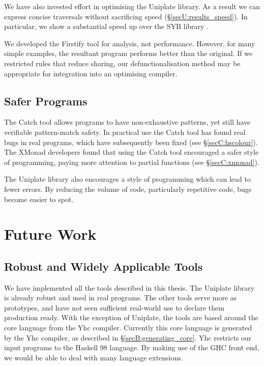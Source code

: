 We have also invested effort in optimising the Uniplate library. As a result we can express concise traversals without sacrificing speed (\S\ref{secU:results_speed}). In particular, we show a substantial speed up over the SYB library \cite{lammel:syb}.

We developed the Firstify tool for analysis, not performance. However, for many simple examples, the resultant program performs better than the original. If we restricted rules that reduce sharing, our defunctionalisation method may be appropriate for integration into an optimising compiler.

\subsection{Safer Programs}

The Catch tool allows programs to have non-exhaustive patterns, yet still have verifiable pattern-match safety. In practical use the Catch tool has found real bugs in real programs, which have subsequently been fixed (see \S\ref{secC:hscolour}). The XMonad developers found that using the Catch tool encouraged a safer style of programming, paying more attention to partial functions (see \S\ref{secC:xmonad}).

The Uniplate library also encourages a style of programming which can lead to fewer errors. By reducing the volume of code, particularly repetitive code, bugs become easier to spot.

\section{Future Work}
\label{secE:future_work}

\subsection{Robust and Widely Applicable Tools}

We have implemented all the tools described in this thesis. The Uniplate library is already robust and used in real programs. The other tools serve more as prototypes, and have not seen sufficient real-world use to declare them production ready. With the exception of Uniplate, the tools are based around the core language from the Yhc compiler. Currently this core language is generated by the Yhc compiler, as described in \S\ref{secB:generating_core}. Yhc restricts our input programs to the Haskell 98 language. By making use of the GHC front end, we would be able to deal with many language extensions.

